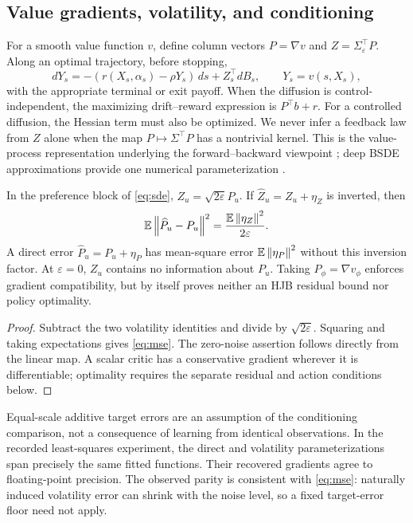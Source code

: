 \subsection{Value gradients, volatility, and conditioning}
For a smooth value function $v$, define column vectors $P=\nabla v$ and $Z=\Sigma_\varepsilon^\top P$. Along an optimal trajectory, before stopping,
\begin{equation}\label{eq:bsde}
 dY_s=-(r(X_s,\alpha_s)-\rho Y_s)\,ds+Z_s^\top dB_s,
 \qquad Y_s=v(s,X_s),
\end{equation}
with the appropriate terminal or exit payoff. When the diffusion is control-independent, the maximizing drift--reward expression is $P^\top b+r$. For a controlled diffusion, the Hessian term must also be optimized. We never infer a feedback law from $Z$ alone when the map $P\mapsto\Sigma^\top P$ has a nontrivial kernel. This is the value-process representation underlying the forward--backward viewpoint \citep{MaProtterYong1994}; deep BSDE approximations provide one numerical parameterization \citep{HanJentzenE2018}.

\begin{lemma}\label{lem:conditioning}
In the preference block of \eqref{eq:sde}, $Z_u=\sqrt{2\varepsilon}P_u$. If $\widehat Z_u=Z_u+\eta_Z$ is inverted, then
\begin{equation}\label{eq:mse}
 \mathbb E\left\lVert\widehat P_u-P_u\right\rVert^2=\frac{\mathbb E\left\lVert\eta_Z\right\rVert^2}{2\varepsilon}.
\end{equation}
A direct error $\widehat P_u=P_u+\eta_P$ has mean-square error $\mathbb E\left\lVert\eta_P\right\rVert^2$ without this inversion factor. At $\varepsilon=0$, $Z_u$ contains no information about $P_u$. Taking $P_\phi=\nabla v_\phi$ enforces gradient compatibility, but by itself proves neither an HJB residual bound nor policy optimality.
\end{lemma}
\begin{proof}
Subtract the two volatility identities and divide by $\sqrt{2\varepsilon}$. Squaring and taking expectations gives \eqref{eq:mse}. The zero-noise assertion follows directly from the linear map. A scalar critic has a conservative gradient wherever it is differentiable; optimality requires the separate residual and action conditions below.\end{proof}

Equal-scale additive target errors are an assumption of the conditioning comparison, not a consequence of learning from identical observations. In the recorded least-squares experiment, the direct and volatility parameterizations span precisely the same fitted functions. Their recovered gradients agree to floating-point precision. The observed parity is consistent with \eqref{eq:mse}: naturally induced volatility error can shrink with the noise level, so a fixed target-error floor need not apply.

